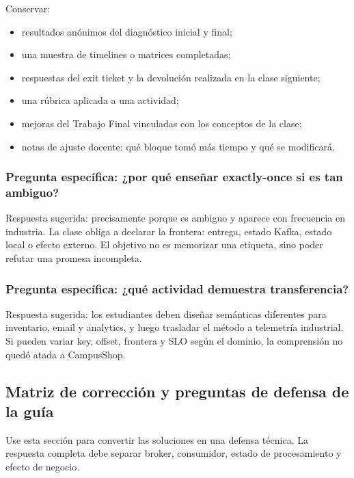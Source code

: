 \documentclass[variant=docente,cover=institutional,mode=screen]{ua-engineering-v6-article}
\begin{document}
Conservar:
\begin{itemize}
\item resultados anónimos del diagnóstico inicial y final;
\item una muestra de timelines o matrices completadas;
\item respuestas del exit ticket y la devolución realizada en la clase siguiente;
\item una rúbrica aplicada a una actividad;
\item mejoras del Trabajo Final vinculadas con los conceptos de la clase;
\item notas de ajuste docente: qué bloque tomó más tiempo y qué se modificará.
\end{itemize}

\subsubsection{Pregunta específica: ¿por qué enseñar exactly-once si es tan ambiguo?}

Respuesta sugerida: precisamente porque es ambiguo y aparece con frecuencia en industria. La clase obliga a declarar la frontera: entrega, estado Kafka, estado local o efecto externo. El objetivo no es memorizar una etiqueta, sino poder refutar una promesa incompleta.

\subsubsection{Pregunta específica: ¿qué actividad demuestra transferencia?}

Respuesta sugerida: los estudiantes deben diseñar semánticas diferentes para inventario, email y analytics, y luego trasladar el método a telemetría industrial. Si pueden variar key, offset, frontera y SLO según el dominio, la comprensión no quedó atada a CampusShop.

\subsection{Matriz de corrección y preguntas de defensa de la guía}
Use esta sección para convertir las soluciones en una defensa técnica. La respuesta completa debe separar broker, consumidor, estado de procesamiento y efecto de negocio.
\end{document}
